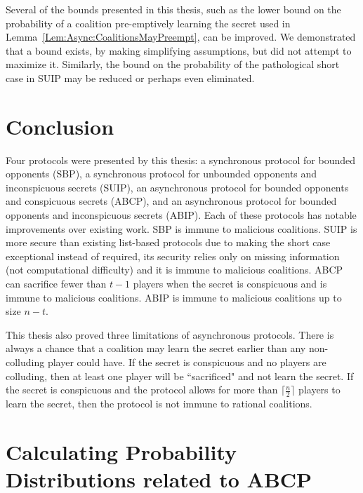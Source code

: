 \documentclass[12pt]{dalcsthesis}
\begin{document}
Several of the bounds presented in this thesis, such as the lower bound on the probability of a coalition pre-emptively learning the secret used in Lemma~\ref{Lem:Async:CoalitionsMayPreempt}, can be improved. We demonstrated that a bound exists, by making simplifying assumptions, but did not attempt to maximize it. Similarly, the bound on the probability of the pathological short case in SUIP may be reduced or perhaps even eliminated. 



\chapter{Conclusion}
\label{chapter:Conclusion}

Four protocols were presented by this thesis: a synchronous protocol for bounded opponents (SBP), a synchronous protocol for unbounded opponents and inconspicuous secrets (SUIP), an asynchronous protocol for bounded opponents and conspicuous secrets (ABCP), and an asynchronous protocol for bounded opponents and inconspicuous secrets (ABIP). Each of these protocols has notable improvements over existing work. SBP is immune to malicious coalitions. SUIP is more secure than existing list-based protocols due to making the short case exceptional instead of required, its security relies only on missing information (not computational difficulty) and it is immune to malicious coalitions. ABCP can sacrifice fewer than $t-1$ players when the secret is conspicuous and is immune to malicious coalitions. ABIP is immune to malicious coalitions up to size $n-t$.

This thesis also proved three limitations of asynchronous protocols. There is always a chance that a coalition may learn the secret earlier than any non-colluding player could have. If the secret is conspicuous and no players are colluding, then at least one player will be ``sacrificed" and not learn the secret. If the secret is conspicuous and the protocol allows for more than $\lceil \frac{n}{2} \rceil$ players to learn the secret, then the protocol is not immune to rational coalitions.









\appendix
\chapter{Calculating Probability Distributions related to ABCP }
\label{Appendix:ABCP:Probabilities}
\end{document}
